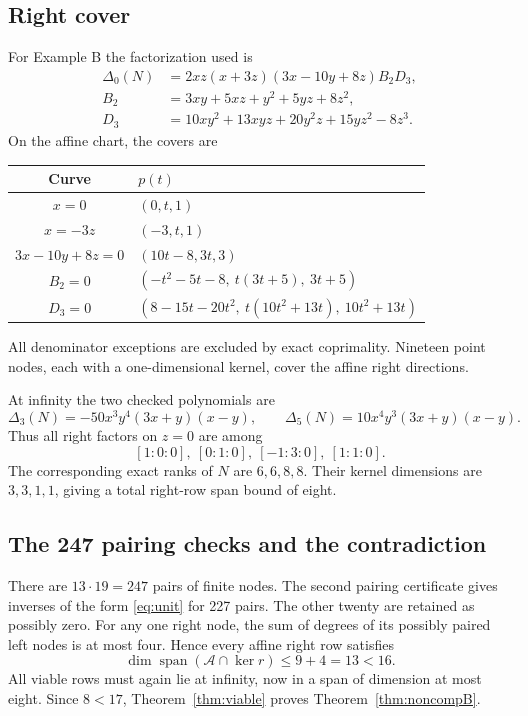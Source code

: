 \documentclass[11pt]{article}
\theoremstyle{definition}\newtheorem{definition}[theorem]{Definition}
\newcommand{\Span}{\operatorname{span}}
\begin{document}
\subsection{Right cover}
For Example B the factorization used is
\begin{align}\label{eq:Brightfactor}
\Delta_0(N)&=2xz(x+3z)(3x-10y+8z)B_2D_3,\\
B_2&=3xy+5xz+y^2+5yz+8z^2,\nonumber\\
D_3&=10xy^2+13xyz+20y^2z+15yz^2-8z^3.\nonumber
\end{align}
On the affine chart, the covers are
\begin{center}\small
\begin{tabular}{@{}cl@{}}\toprule
Curve & $p(t)$ \\\midrule
$x=0$ & $(0,t,1)$\\
$x=-3z$ & $(-3,t,1)$\\
$3x-10y+8z=0$ & $(10t-8,3t,3)$\\
$B_2=0$ & $(-t^2-5t-8,\ t(3t+5),\ 3t+5)$\\
$D_3=0$ & $(8-15t-20t^2,\ t(10t^2+13t),\ 10t^2+13t)$\\\bottomrule
\end{tabular}\end{center}
All denominator exceptions are excluded by exact coprimality. Nineteen point nodes, each with a one-dimensional kernel, cover the affine right directions.

At infinity the two checked polynomials are
\[
\Delta_3(N)=-50x^3y^4(3x+y)(x-y),\qquad
\Delta_5(N)=10x^4y^3(3x+y)(x-y).
\]
Thus all right factors on $z=0$ are among
\[
[1:0:0],\ [0:1:0],\ [-1:3:0],\ [1:1:0].
\]
The corresponding exact ranks of $N$ are $6,6,8,8$. Their kernel dimensions are $3,3,1,1$, giving a total right-row span bound of eight.

\subsection{The 247 pairing checks and the contradiction}
There are $13\cdot19=247$ pairs of finite nodes. The second pairing certificate gives inverses of the form \eqref{eq:unit} for 227 pairs. The other twenty are retained as possibly zero. For any one right node, the sum of degrees of its possibly paired left nodes is at most four. Hence every affine right row satisfies
\[
\dim\Span(\mathcal A\cap\ker r)\le9+4=13<16.
\]
All viable rows must again lie at infinity, now in a span of dimension at most eight. Since $8<17$, Theorem~\ref{thm:viable} proves Theorem~\ref{thm:noncompB}.
\end{document}
